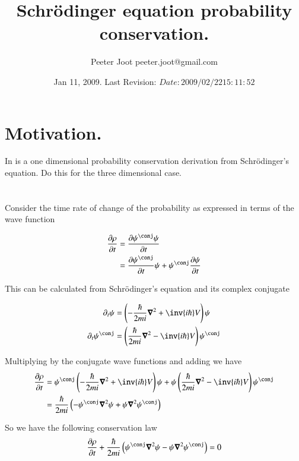 \documentclass{article}
\title{ Schr\"{o}dinger equation probability conservation. }
\author{Peeter Joot \quad peeter.joot@gmail.com}
\date{ Jan 11, 2009.  Last Revision: $Date: 2009/02/22 15:11:52 $ }
\begin{document}
\maketitle{}
\section{ Motivation. }

In \cite{mcmahon2005qmd} is a one dimensional probability conservation
derivation from
Schr\"{o}dinger's equation.  Do this for the three dimensional case.

\section{}

Consider the time rate of change of the probability as expressed 
in terms of the wave function

\begin{align*}
\PD{t}{\rho} 
&= \PD{t}{\psi^\conj \psi} \\
&= \PD{t}{\psi^\conj} \psi + \psi^\conj \PD{t}{\psi} \\
\end{align*}

This can be calculated from Schr\"{o}dinger's equation and its complex
conjugate

\begin{align*}
\partial_t \psi &= \left(-\frac{\hbar}{2mi}\spacegrad^2 + \inv{i\hbar} V \right) \psi \\
\partial_t \psi^\conj &= \left(\frac{\hbar}{2mi}\spacegrad^2 - \inv{i\hbar} V \right) \psi^\conj \\
\end{align*}

Multiplying by the conjugate wave functions and adding we have
\begin{align*}
\PD{t}{\rho}
&=
\psi^\conj \left(-\frac{\hbar}{2mi}\spacegrad^2 + \inv{i\hbar} V \right) \psi +
\psi \left(\frac{\hbar}{2mi}\spacegrad^2 - \inv{i\hbar} V \right) \psi^\conj \\
&=
\frac{\hbar}{2mi} \left(
-\psi^\conj \spacegrad^2 \psi + \psi \spacegrad^2 \psi^\conj \right) \\
\end{align*}

So we have the following conservation law
\begin{align}\label{eqn:intermediate}
\PD{t}{\rho} + \frac{\hbar}{2mi} \left( \psi^\conj \spacegrad^2 \psi - \psi \spacegrad^2 \psi^\conj \right) = 0
\end{align}
\end{document}

